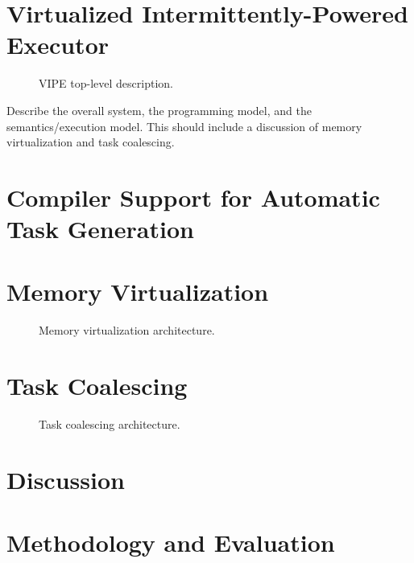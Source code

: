 \documentclass[pageno]{jpaper}
\newcommand{\sys}{VIPE\xspace}
\newcommand{\sysfull}{Virtualized Intermittently-Powered Executor\xspace}
\begin{document}
\section{\sysfull}
\label{sec:overeall_system}

\begin{figure}
	\centering
	\caption{\sys top-level description.}
	\label{fig:}
\end{figure}

Describe the overall system, the programming model, and the semantics/execution model. This should include a discussion of memory virtualization and task coalescing.

\section{Compiler Support for Automatic Task Generation}
\label{sec:compiler}



\section{Memory Virtualization}
\label{sec:memory_virtulaization}



\begin{figure}
	\centering
	\caption{Memory virtualization architecture.}
	\label{fig:}
\end{figure}

\section{Task Coalescing}
\label{sec:memory_virtulaization}

\begin{figure}
	\centering
	\caption{Task coalescing architecture.}
	\label{fig:}
\end{figure}

\section{Discussion}
\label{sec:discussion}

\section{Methodology and Evaluation}
\label{sec:methodology_evaluation}
\end{document}
